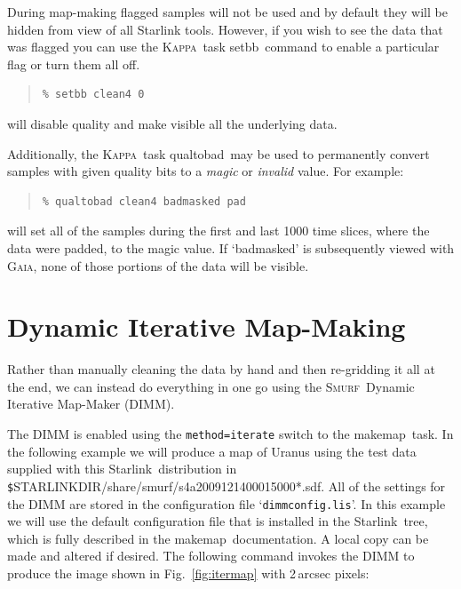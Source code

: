 \documentclass[twoside,11pt]{article}
\newenvironment{myquote}{\begin{quote}\begin{small}}{\end{small}\end{quote}}
\newcommand{\starlink}{\htmladdnormallink{Starlink}{http://starlink.jach.hawaii.edu}}
\newcommand{\Kappa}{\xref{\textsc{Kappa}}{sun95}{}}
\newcommand{\gaia}{\xref{\textsc{Gaia}}{sun214}{}}
\newcommand{\smurf}{\xref{\textsc{Smurf}}{sun258}{}}
\newcommand{\task}[1]{\textsf{#1}}
\newcommand{\makemap}{\xref{\task{makemap}}{sun258}{MAKEMAP}}
\newcommand{\qualtobad}{\xref{\task{qualtobad}}{sun95}{QUALTOBAD}}
\newcommand{\setbb}{\xref{\task{setbb}}{sun95}{SETBB}}
\newcommand{\htmladdnormallink}[2]{#1}
\newcommand{\xref}[3]{#1}
\newcommand{\xlabel}[1]{}
\renewcommand{\_}{\texttt{\symbol{95}}}
\begin{document}
During map-making flagged samples will not be used and by default they
will be hidden from view of all Starlink tools. However, if you wish
to see the data that was flagged you can use the \Kappa\ task \setbb\
command to enable a particular flag or turn them all off.

\begin{myquote}
\begin{verbatim}
% setbb clean4 0
\end{verbatim}
\end{myquote}

will disable quality and make visible all the underlying data.

Additionally, the \Kappa\ task \qualtobad\ may be used to
permanently convert samples with given quality bits to a {\em magic\/} or {\em
  invalid\/} value. For example:

\begin{myquote}
\begin{verbatim}
% qualtobad clean4 badmasked pad
\end{verbatim}
\end{myquote}
%
will set all of the samples during the first and last 1000 time
slices, where the data were padded, to the magic value.  If
`badmasked' is subsequently viewed with \gaia, none of those portions
of the data will be visible.

\section{\xlabel{maps}Dynamic Iterative Map-Making}
\label{sec:maps}

Rather than manually cleaning the data by hand and then re-gridding it
all at the end, we can instead do everything in one go using the
\smurf\ Dynamic Iterative Map-Maker (DIMM).

The DIMM is enabled using the \texttt{method=iterate} switch to the
\makemap\ task. In the following example we will produce a map of
Uranus using the test data supplied with this \starlink\ distribution
in {\texttt \$STARLINK\_DIR/share/smurf/s4a20091214\_00015\_000*.sdf}. All
of the settings for the DIMM are stored in the configuration file
`\texttt{dimmconfig.lis}'. In this example we will use the default
configuration file that is installed in the \starlink\ tree, which is
fully described in the \makemap\ documentation. A local copy can be
made and altered if desired. The following command invokes the DIMM to
produce the image shown in Fig.~\ref{fig:itermap} with 2\,arcsec
pixels:
\end{document}
